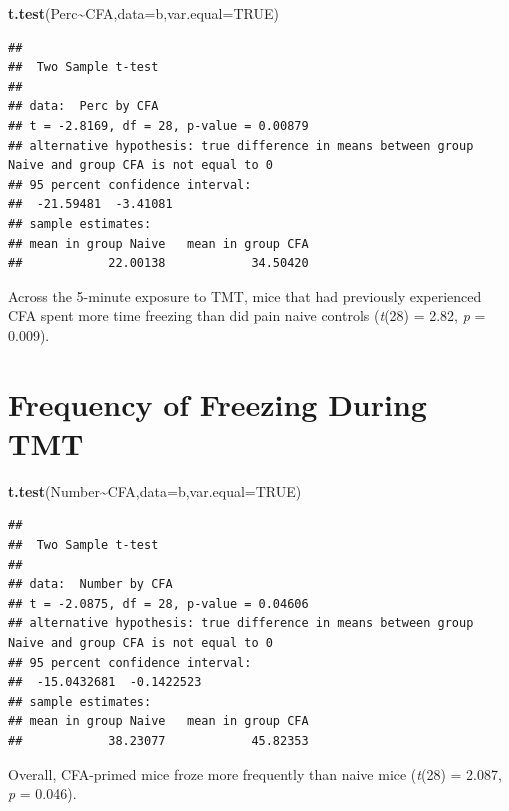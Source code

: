 \documentclass[
]{book}
\newenvironment{Shaded}{\begin{snugshade}}{\end{snugshade}}
\newcommand{\AttributeTok}[1]{\textcolor[rgb]{0.13,0.29,0.53}{#1}}
\newcommand{\ConstantTok}[1]{\textcolor[rgb]{0.56,0.35,0.01}{#1}}
\newcommand{\FunctionTok}[1]{\textcolor[rgb]{0.13,0.29,0.53}{\textbf{#1}}}
\newcommand{\NormalTok}[1]{#1}
\newcommand{\SpecialCharTok}[1]{\textcolor[rgb]{0.81,0.36,0.00}{\textbf{#1}}}
\begin{document}
\begin{Shaded}
\begin{Highlighting}[]
\FunctionTok{t.test}\NormalTok{(Perc}\SpecialCharTok{\textasciitilde{}}\NormalTok{CFA,}\AttributeTok{data=}\NormalTok{b,}\AttributeTok{var.equal=}\ConstantTok{TRUE}\NormalTok{)}
\end{Highlighting}
\end{Shaded}

\begin{verbatim}
## 
##  Two Sample t-test
## 
## data:  Perc by CFA
## t = -2.8169, df = 28, p-value = 0.00879
## alternative hypothesis: true difference in means between group Naive and group CFA is not equal to 0
## 95 percent confidence interval:
##  -21.59481  -3.41081
## sample estimates:
## mean in group Naive   mean in group CFA 
##            22.00138            34.50420
\end{verbatim}

Across the 5-minute exposure to TMT, mice that had previously experienced CFA spent more time freezing than did pain naive controls (\emph{t}(28) = 2.82, \emph{p} = 0.009).

\section*{Frequency of Freezing During TMT}\label{frequency-of-freezing-during-tmt}

\begin{Shaded}
\begin{Highlighting}[]
\FunctionTok{t.test}\NormalTok{(Number}\SpecialCharTok{\textasciitilde{}}\NormalTok{CFA,}\AttributeTok{data=}\NormalTok{b,}\AttributeTok{var.equal=}\ConstantTok{TRUE}\NormalTok{)}
\end{Highlighting}
\end{Shaded}

\begin{verbatim}
## 
##  Two Sample t-test
## 
## data:  Number by CFA
## t = -2.0875, df = 28, p-value = 0.04606
## alternative hypothesis: true difference in means between group Naive and group CFA is not equal to 0
## 95 percent confidence interval:
##  -15.0432681  -0.1422523
## sample estimates:
## mean in group Naive   mean in group CFA 
##            38.23077            45.82353
\end{verbatim}

Overall, CFA-primed mice froze more frequently than naive mice (\emph{t}(28) = 2.087, \emph{p} = 0.046).
\end{document}
